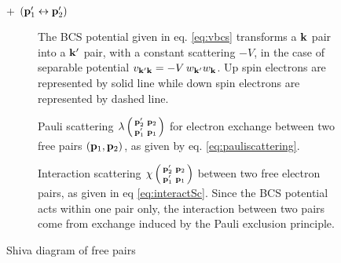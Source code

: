 \documentclass[aps,pra,amsmath,amssymb,preprint,groupedaddress]{revtex4}
\begin{document}
 \begin{figure}[htb]
 \centering
 \qquad
 \\
   + \qquad $\left(\mathbf{p}'_1\leftrightarrow\mathbf{p}'_2\right)$
 \caption{Shiva diagram of free pairs }


 \begin{description}
 \item[] The BCS potential given in eq. \eqref{eq:vbcs} transforms a $\mathbf{k}$ pair into a $\mathbf{k}'$ pair, with a constant scattering $-V$, in the case of separable potential $v_{\mathbf{k}'\mathbf{k}}=-V\,w_{\mathbf{k}'}w_{\mathbf{k}}$. Up spin electrons are represented by solid line while down spin electrons are represented by dashed line.
 
 \item[] Pauli scattering $\lambda\left(\begin{smallmatrix}\mathbf{p}'_2&\mathbf{p}_2\\\mathbf{p}'_1&\mathbf{p}_1\end{smallmatrix}\right)$ for electron exchange between two free pairs $\left(\mathbf{p}_1,\mathbf{p}_2\right)$, as given by eq. \eqref{eq:pauliscattering}.
 
 \item[] Interaction scattering  $\chi\left(\begin{smallmatrix}\mathbf{p}'_2&\mathbf{p}_2\\\mathbf{p}'_1&\mathbf{p}_1\end{smallmatrix}\right)$ between two free electron pairs, as given in eq \eqref{eq:interactSc}. Since the BCS potential acts within one pair only, the interaction between two pairs come from exchange induced by the Pauli exclusion principle.
 \end{description} 


 \end{figure}
\end{document}
